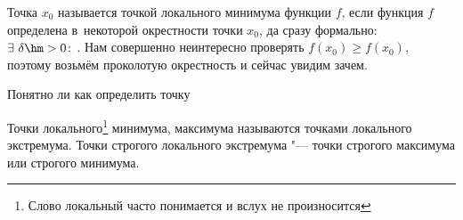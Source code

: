 \label{ex}
    Точка $x_0$ называется точкой локального минимума функции $f$, если функция $f$ определена в~некоторой окрестности точки $x_0$, да сразу формально:\\
    $\exists\  \delta\hm>0\colon$. Нам совершенно неинтересно проверять $f(x_0)\geq f(x_0)$, поэтому возьмём проколотую окрестность и сейчас увидим зачем.


Понятно ли как определить точку 

Точки локального\footnote{Слово локальный часто понимается и вслух не произносится} минимума, максимума называются точками локального экстремума.
Точки строгого локального экстремума "--- точки строгого максимума или строгого минимума.

